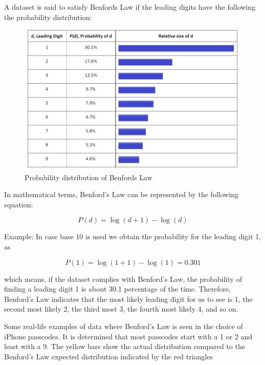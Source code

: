 A dataset is said to satisfy Benfords Law if the leading 
digits have the following the probability distribution: 

\begin{figure}[!ht]
\centering\includegraphics[width=\columnwidth]{images/benfords_law.JPG}
  \caption{Probability distribution of Benfords Law}\label{f:prob-dist-ben}
\end{figure}


In mathematical terms, Benford’s Law can be represented 
by the following equation:

\[P (d) = \log (d+1) - \log (d)\]

Example: In case base 10 is used we obtain the 
probability for the leading digit 1, as

\[P (1) = \log (1+1) - \log (1) = 0.301 \]

which means, if the dataset complies 
with Benford's Law, the probability of finding a 
leading digit 1 is about 30.1 percentage of the time. 
Therefore, Benford’s Law indicates that the most 
likely leading digit for us to see is 1, the second 
most likely 2, the third most 3, the fourth most 
likely 4, and so on.

Some real-life examples of data where Benford’s Law is 
seen in the choice of iPhone passcodes. 
It is determined that most passcodes start with a 1 or  
2 and least with a 9. The yellow bars show the actual
distribution compared to the Benford’s 
Law expected distribution indicated by the 
red triangles~\cite{hid-sp18-514-iphone-benford}

